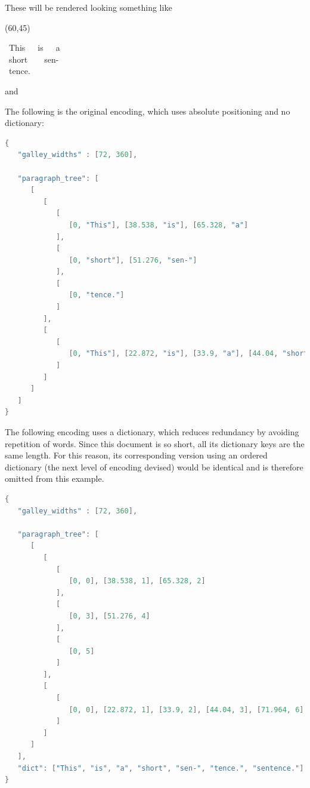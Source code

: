 These will be rendered looking something like

{\singlespacing
\framebox(60,45){
    \parbox{60\unitlength}{\mbox{~}This~~~is~~~a\\\mbox{~}short~~~~sen-\\\mbox{~}tence.}
}}

and


\vspace{0.5in}
The following is the original encoding, which uses absolute positioning and no dictionary:

\vspace{0.5in}
\begin{lstlisting}[language=c,stringstyle=\color{blue},basicstyle=\ttfamily\footnotesize\singlespacing]
{
   "galley_widths" : [72, 360],

   "paragraph_tree": [
      [
         [
            [
               [0, "This"], [38.538, "is"], [65.328, "a"]
            ],
            [
               [0, "short"], [51.276, "sen-"]
            ],
            [
               [0, "tence."]
            ]
         ],
         [
            [
               [0, "This"], [22.872, "is"], [33.9, "a"], [44.04, "short"], [71.964, "sentence."]
            ]
         ]
      ]
   ]
}
\end{lstlisting}

\clearpage

The following encoding uses a dictionary, which reduces redundancy by avoiding repetition of words. Since this document is so short, all its dictionary keys are the same length. For this reason, its corresponding version using an ordered dictionary (the next level of encoding devised) would be identical and is therefore omitted from this example.

\vspace{0.5in}
\begin{lstlisting}[language=c,stringstyle=\color{blue},basicstyle=\ttfamily\footnotesize\singlespacing]
{
   "galley_widths" : [72, 360],

   "paragraph_tree": [
      [
         [
            [
               [0, 0], [38.538, 1], [65.328, 2]
            ],
            [
               [0, 3], [51.276, 4]
            ],
            [
               [0, 5]
            ]
         ],
         [
            [
               [0, 0], [22.872, 1], [33.9, 2], [44.04, 3], [71.964, 6]
            ]
         ]
      ]
   ],
   "dict": ["This", "is", "a", "short", "sen-", "tence.", "sentence."]
}
\end{lstlisting}

